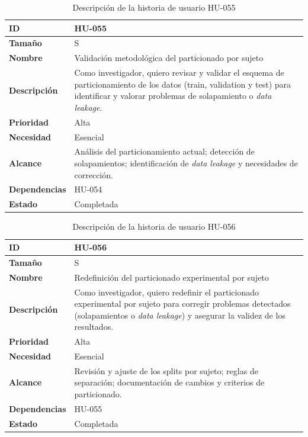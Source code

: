 \documentclass{report}
\begin{document}
\begin{table}[H]
\centering
\caption{Descripción de la historia de usuario HU-055}
\label{tab:hu055}
\begin{tabular}{|l|p{12cm}|}
\hline
\textbf{ID} & HU-055 \\ \hline
\textbf{Tamaño} & S \\ \hline
\textbf{Nombre} & Validación metodológica del particionado por sujeto \\ \hline
\textbf{Descripción} &
Como investigador, quiero revisar y validar el esquema de particionamiento de los datos (train, validation y test) para identificar y valorar problemas de solapamiento o \textit{data leakage}. \\ \hline
\textbf{Prioridad} & Alta \\ \hline
\textbf{Necesidad} & Esencial \\ \hline
\textbf{Alcance} &
Análisis del particionamiento actual; detección de solapamientos; identificación de \textit{data leakage} y necesidades de corrección. \\ \hline
\textbf{Dependencias} &
HU-054 \\ \hline
\textbf{Estado} & Completada \\ \hline
\end{tabular}
\end{table}


\begin{table}[H]
\centering
\caption{Descripción de la historia de usuario HU-056}
\label{tab:hu056}
\begin{tabular}{|l|p{12cm}|}
\hline
\textbf{ID} & HU-056 \\ \hline
\textbf{Tamaño} & S \\ \hline
\textbf{Nombre} & Redefinición del particionado experimental por sujeto \\ \hline
\textbf{Descripción} &
Como investigador, quiero redefinir el particionado experimental por sujeto para corregir problemas detectados (solapamientos o \textit{data leakage}) y asegurar la validez de los resultados. \\ \hline
\textbf{Prioridad} & Alta \\ \hline
\textbf{Necesidad} & Esencial \\ \hline
\textbf{Alcance} &
Revisión y ajuste de los splits por sujeto; reglas de separación; documentación de cambios y criterios de particionado. \\ \hline
\textbf{Dependencias} & HU-055 \\ \hline
\textbf{Estado} & Completada \\ \hline
\end{tabular}
\end{table}
\end{document}
